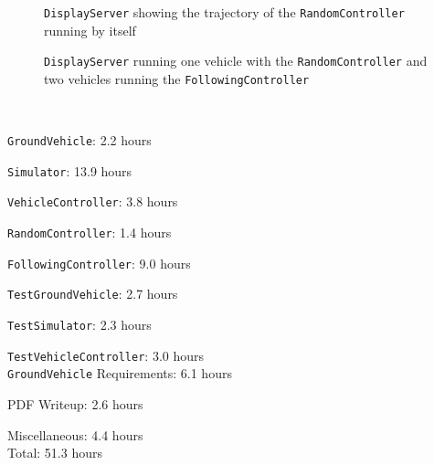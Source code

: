 \documentclass[12pt]{article}
\begin{document}

\begin{figure}[H]
  \centering
{}
  \caption{{\tt DisplayServer} showing the trajectory of the {\tt RandomController} running by itself}
\end{figure}
\begin{figure}[H]
  \centering
{}
  \caption{{\tt DisplayServer} running one vehicle with the {\tt RandomController} and two vehicles running the {\tt FollowingController}}
\end{figure}

	\\
	
	\medskip
		
\noindent		
	   {\tt GroundVehicle}: 2.2 hours
		
\noindent		
	   {\tt     Simulator}: 13.9 hours
	
\noindent		
		   {\tt     VehicleController}: 3.8  hours
	
\noindent		
	   {\tt     RandomController}: 1.4 hours
	
\noindent		
	   {\tt     FollowingController}: 9.0 hours
	
\noindent		
	   {\tt     TestGroundVehicle}: 2.7 hours
	
\noindent		
	   {\tt     TestSimulator}: 2.3 hours
	
\noindent		
	   {\tt     TestVehicleController}: 3.0 hours\\
	
		   {\tt     GroundVehicle} Requirements: 6.1 hours
	
	     PDF Writeup: 2.6 hours
	
	     Miscellaneous: 4.4 hours\\


\noindent		
	      Total: 51.3 hours
	
\end{document}
